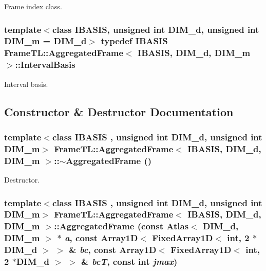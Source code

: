 Frame index class. \hypertarget{classFrameTL_1_1AggregatedFrame_989c4119c49eeea3d42689317393e35a}{
\subsubsection[{IntervalBasis}]{\setlength{\rightskip}{0pt plus 5cm}template$<$class IBASIS, unsigned int DIM\_\-d, unsigned int DIM\_\-m = DIM\_\-d$>$ {\bf typedef} IBASIS {\bf FrameTL::AggregatedFrame}$<$ IBASIS, DIM\_\-d, DIM\_\-m $>$::{\bf IntervalBasis}}}
\label{classFrameTL_1_1AggregatedFrame_989c4119c49eeea3d42689317393e35a}


Interval basis. 

\subsection{Constructor \& Destructor Documentation}
\hypertarget{classFrameTL_1_1AggregatedFrame_855b4a899b7f5845cd81029909bd8a19}{
\subsubsection[{$\sim$AggregatedFrame}]{\setlength{\rightskip}{0pt plus 5cm}template$<$class IBASIS , unsigned int DIM\_\-d, unsigned int DIM\_\-m$>$ {\bf FrameTL::AggregatedFrame}$<$ IBASIS, DIM\_\-d, DIM\_\-m $>$::$\sim${\bf AggregatedFrame} ()}}
\label{classFrameTL_1_1AggregatedFrame_855b4a899b7f5845cd81029909bd8a19}


Destructor. \hypertarget{classFrameTL_1_1AggregatedFrame_653c47a2514e9099a56935f7b5819377}{
\subsubsection[{AggregatedFrame}]{\setlength{\rightskip}{0pt plus 5cm}template$<$class IBASIS , unsigned int DIM\_\-d, unsigned int DIM\_\-m$>$ {\bf FrameTL::AggregatedFrame}$<$ IBASIS, DIM\_\-d, DIM\_\-m $>$::{\bf AggregatedFrame} (const Atlas$<$ DIM\_\-d, DIM\_\-m $>$ $\ast$ {\em a}, \/  const Array1D$<$ FixedArray1D$<$ int, 2 $\ast$DIM\_\-d $>$ $>$ \& {\em bc}, \/  const Array1D$<$ FixedArray1D$<$ int, 2 $\ast$DIM\_\-d $>$ $>$ \& {\em bcT}, \/  const int {\em jmax})}}
\label{classFrameTL_1_1AggregatedFrame_653c47a2514e9099a56935f7b5819377}


